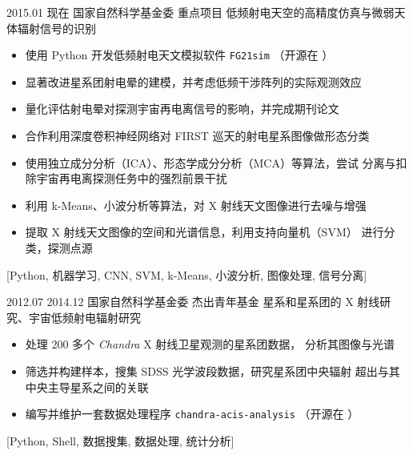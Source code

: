 \documentclass[zh]{resume}
\begin{document}
\begin{projects}
  \project
    {2015.01}%
    {现在}%
    {国家自然科学基金委}%
    {重点项目}%
    {低频射电天空的高精度仿真与微弱天体辐射信号的识别}%
    {\begin{itemize}
      \item 使用 Python 开发低频射电天文模拟软件 \texttt{FG21sim}
            （开源在 ）
      \item 显著改进星系团射电晕的建模，并考虑低频干涉阵列的实际观测效应
      \item 量化评估射电晕对探测宇宙再电离信号的影响，并完成期刊论文
      \item 合作利用深度卷积神经网络对 FIRST 巡天的射电星系图像做形态分类
      \item 使用独立成分分析（ICA）、形态学成分分析（MCA）等算法，尝试
            分离与扣除宇宙再电离探测任务中的强烈前景干扰
      \item 利用 k-Means、小波分析等算法，对 X 射线天文图像进行去噪与增强
      \item 提取 X 射线天文图像的空间和光谱信息，利用支持向量机（SVM）
            进行分类，探测点源
    \end{itemize}}%
    [Python, 机器学习, CNN, SVM, k-Means, 小波分析, 图像处理, 信号分离]

  \separator{1em}
  \project
    {2012.07}%
    {2014.12}%
    {国家自然科学基金委}%
    {杰出青年基金}%
    {星系和星系团的 X 射线研究、宇宙低频射电辐射研究}%
    {\begin{itemize}
      \item 处理 200 多个 \textit{Chandra} X 射线卫星观测的星系团数据，
            分析其图像与光谱
      \item 筛选并构建样本，搜集 SDSS 光学波段数据，研究星系团中央辐射
            超出与其中央主导星系之间的关联
      \item 编写并维护一套数据处理程序 \texttt{chandra-acis-analysis}
            （开源在 ）
    \end{itemize}}%
    [Python, Shell, 数据搜集, 数据处理, 统计分析]
\end{projects}
\end{document}
